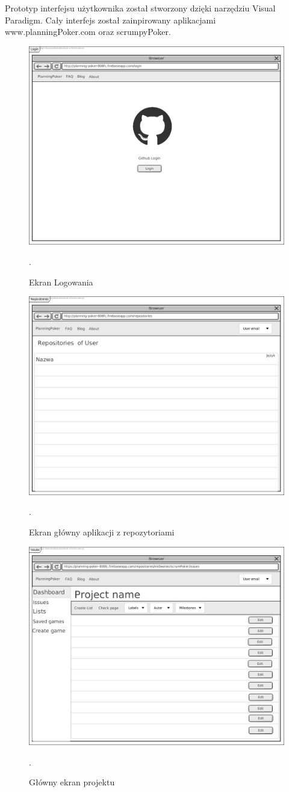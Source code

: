 Prototyp interfejsu użytkownika został stworzony dzięki narzędziu Visual Paradigm.
Cały interfejs został zainpirowany aplikacjami www.planningPoker.com oraz scrumpyPoker.

\begin{figure}[h]
	\centering\includegraphics[width=.5\textwidth]{img/LoginScreen}
	\caption{Ekran Logowania}.
	\label{rys:loginScreen}
\end{figure}

\begin{figure}[h]
	\centering\includegraphics[width=.7\textwidth]{img/RepositoriesScreen}
	\caption{Ekran główny aplikacji z repozytoriami}.
	\label{rys:RepositoriesScreen}
\end{figure}

\begin{figure}[h]
	\centering\includegraphics[width=.7\textwidth]{img/IssuesScreen}
	\caption{Główny ekran projektu}.
	\label{rys:IssuesScreen}
\end{figure}

